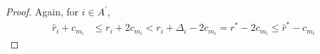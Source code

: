 \begin{proof}
  Again, for ${i} \in A^{'}$, 
  \begin{align*}
\hat{r}_{i} + c_{m_{i}}&\leq r_{i} + 2c_{m_{i}} 
 < r_{i} + \Delta_{i} - 2c_{m_{i}}
 = r^{*} -2c_{m_{i}} 
 \leq \hat{r}^{*} - c_{m_{i}}
  \end{align*}


% 
 

\end{proof}
